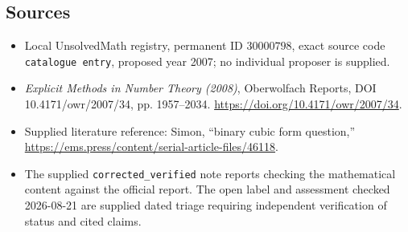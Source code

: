 \documentclass[11pt]{article}
\begin{document}
\subsection{Sources}
\begin{itemize}
\item Local UnsolvedMath registry, permanent ID \(30000798\), exact source code \texttt{catalogue entry}, proposed year 2007; no individual proposer is supplied.
\item \emph{Explicit Methods in Number Theory (2008)}, Oberwolfach Reports, DOI 10.4171/owr/2007/34, pp. 1957--2034. \url{https://doi.org/10.4171/owr/2007/34}.
\item Supplied literature reference: Simon, ``binary cubic form question,'' \url{https://ems.press/content/serial-article-files/46118}.
\item The supplied \texttt{corrected\_verified} note reports checking the mathematical content against the official report. The open label and assessment checked 2026-08-21 are supplied dated triage requiring independent verification of status and cited claims.
\end{itemize}
\end{document}

